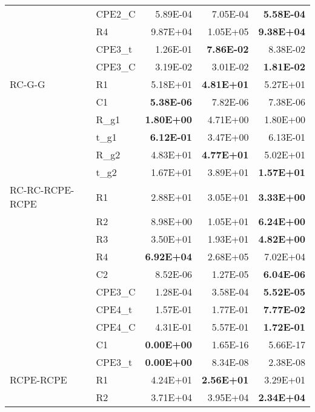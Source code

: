 \begin{tabular}{llrrr}
                     &     CPE2\_C  & 5.89E-04 & 7.05E-04 & \textbf{5.58E-04}\\
                     &         R4  & 9.87E+04 & 1.05E+05 & \textbf{9.38E+04}\\
                     &     CPE3\_t  & 1.26E-01 & \textbf{7.86E-02} & 8.38E-02\\
                     &     CPE3\_C  & 3.19E-02 & 3.01E-02 & \textbf{1.81E-02}\\
             RC-G-G  &         R1  & 5.18E+01 & \textbf{4.81E+01} & 5.27E+01\\
                     &         C1  & \textbf{5.38E-06} & 7.82E-06 & 7.38E-06\\
                     &       R\_g1  & \textbf{1.80E+00} & 4.71E+00 & 1.80E+00\\
                     &       t\_g1  & \textbf{6.12E-01} & 3.47E+00 & 6.13E-01\\
                     &       R\_g2  & 4.83E+01 & \textbf{4.77E+01} & 5.02E+01\\
                     &       t\_g2  & 1.67E+01 & 3.89E+01 & \textbf{1.57E+01}\\
    RC-RC-RCPE-RCPE  &         R1  & 2.88E+01 & 3.05E+01 & \textbf{3.33E+00}\\
                     &         R2  & 8.98E+00 & 1.05E+01 & \textbf{6.24E+00}\\
                     &         R3  & 3.50E+01 & 1.93E+01 & \textbf{4.82E+00}\\
                     &         R4  & \textbf{6.92E+04} & 2.68E+05 & 7.02E+04\\
                     &         C2  & 8.52E-06 & 1.27E-05 & \textbf{6.04E-06}\\
                     &     CPE3\_C  & 1.28E-04 & 3.58E-04 & \textbf{5.52E-05}\\
                     &     CPE4\_t  & 1.57E-01 & 1.77E-01 & \textbf{7.77E-02}\\
                     &     CPE4\_C  & 4.31E-01 & 5.57E-01 & \textbf{1.72E-01}\\
                     &         C1  & \textbf{0.00E+00} & 1.65E-16 & 5.66E-17\\
                     &     CPE3\_t  & \textbf{0.00E+00} & 8.34E-08 & 2.38E-08\\
          RCPE-RCPE  &         R1  & 4.24E+01 & \textbf{2.56E+01} & 3.29E+01\\
                     &         R2  & 3.71E+04 & 3.95E+04 & \textbf{2.34E+04}\\

\end{tabular}
